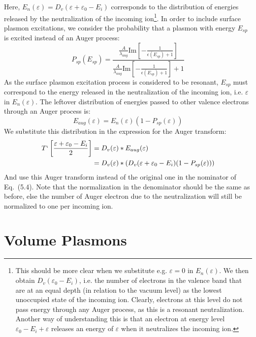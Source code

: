 \begin{refsection}
Here, $E_{n}(\varepsilon) = D_v(\varepsilon + \varepsilon_0 - E_i)$ 
corresponds to the distribution of energies released by the neutralization of 
the incoming ion\footnote{This should be more clear when we substitute e.g. 
$\varepsilon = 0$ in $E_{n}(\varepsilon)$. We then obtain $D_v(\varepsilon_0 - 
E_i)$, i.e. the number of electrons in the valence band that are at an equal 
depth (in relation to the vacuum level) as the lowest unoccupied state of the 
incoming ion. Clearly, electrons at this level do not pass energy through any 
Auger process, as this is a resonant neutralization. Another way of 
understanding this is that an electron at energy level $\varepsilon_0 - E_i + 
\varepsilon$ releases an energy of $\varepsilon$ when it neutralizes the 
incoming ion.}.  In order to include surface plasmon excitations, we consider 
the probability that a plasmon with energy $E_{sp}$ is excited instead of an 
Auger process: 
\begin{equation} 
P_{sp}(E_{sp}) = \frac{ \frac{A}{\lambda_{aug}} 
\text{Im}\left[-\frac{1}{\epsilon(E_{sp}) + 1}\right]}{\frac{A}{\lambda_{aug}} 
\text{Im}\left[-\frac{1}{\epsilon(E_{sp}) + 1}\right] + 1} 
\end{equation} 
As the surface plasmon excitation process is considered to be resonant, 
$E_{sp}$ must correspond to the energy released in the neutralization of the 
incoming ion, i.e. $\varepsilon$ in $E_{n}(\varepsilon)$. The leftover 
distribution of energies passed to other valence electrons through an Auger 
process is: 
\begin{equation} 
    E_{aug}(\varepsilon) = E_{n}(\varepsilon) (1 - P_{sp}(\varepsilon)) 
\end{equation} 
We substitute this distribution in the expression for the Auger transform: 
\begin{equation} 
\begin{aligned} 
T`\left[\frac{\varepsilon + \varepsilon_0 - E_i}{2}\right] &= D_v(\varepsilon) 
* E_{aug}(\varepsilon) \\ &= D_v(\varepsilon) * (D_v(\varepsilon + 
\varepsilon_0 - E_i) (1 - P_{sp}(\varepsilon))) 
\end{aligned} 
\end{equation} 
And use this Auger transform instead of the original one in the nominator of 
Eq.~(5.4). Note that the normalization in the denominator should be the same 
as before, else the number of Auger electron due to the neutralization will 
still be normalized to one per incoming ion. 
 
\section{Volume Plasmons} 
 

\end{refsection}
